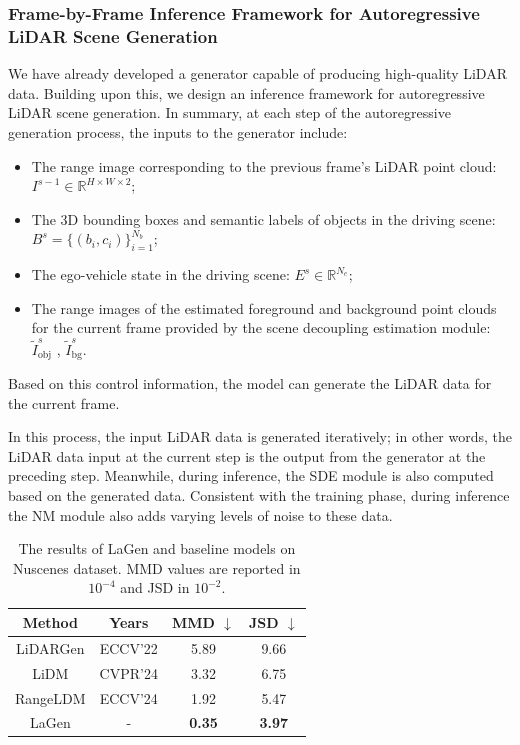 \subsubsection{Frame-by-Frame Inference Framework for Autoregressive LiDAR Scene Generation}
We have already developed a generator capable of producing high-quality LiDAR data. Building upon this, we design an inference framework for autoregressive LiDAR scene generation.
In summary, at each step of the autoregressive generation process, the inputs to the generator include:
\begin{itemize}[leftmargin=*]
\item The range image corresponding to the previous frame’s LiDAR point cloud: \( I^{s-1} \in \mathbb{R}^{H \times W \times 2} \);
\item The 3D bounding boxes and semantic labels of objects in the driving scene: \( B^{s} = \{(b_{i}, c_{i})\}_{i = 1}^{N_{b}} \);
\item The ego-vehicle state in the driving scene: \( E^{s} \in \mathbb{R}^{N_{e}} \);
\item The range images of the estimated foreground and background point clouds for the current frame provided by the scene decoupling estimation module: \( \widetilde{I}_{\text{obj}}^{s} \) , \( \widetilde{I}_{\text{bg}}^{s} \).
\end{itemize}
Based on this control information, the model can generate the LiDAR data for the current frame.

In this process, the input LiDAR data is generated iteratively; in other words, the LiDAR data input at the current step is the output from the generator at the preceding step.
Meanwhile, during inference, the SDE module is also computed based on the generated data.
Consistent with the training phase, during inference the NM module also adds varying levels of noise to these data.

\begin{table}[ht]
\centering
\caption{The results of LaGen and baseline models on Nuscenes dataset. MMD values are reported in $10^{-4}$ and JSD in $10^{-2}$.}
\renewcommand{\arraystretch}{1.1}
\begin{tabular}{cccc}
\toprule
\textbf{Method} &
\textbf{Years} &
\textbf{MMD $\downarrow$} & 
\textbf{JSD $\downarrow$} \\
\midrule 
LiDARGen \cite{LiDARGen2022}  & ECCV'22 & 5.89 & 9.66  \\
LiDM \cite{ran2024towards}     & CVPR'24 & 3.32 & 6.75  \\
RangeLDM \cite{hu2024rangeldm} & ECCV'24 & 1.92 & 5.47 \\
LaGen    & - & \textbf{0.35} & \textbf{3.97} \\
\bottomrule
\end{tabular}
\label{table_generation}
\vspace{-3mm}
\end{table}
